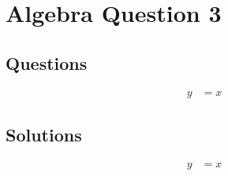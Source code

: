 \chapter{Algebra Question 3}
\label{chap:aq3}

\section{Questions}
\label{sec:aq3q}
\begin{align}
  y &= x
\end{align}

\section{Solutions}
\label{sec:aq3s}
\begin{align}
  y &= x
\end{align}